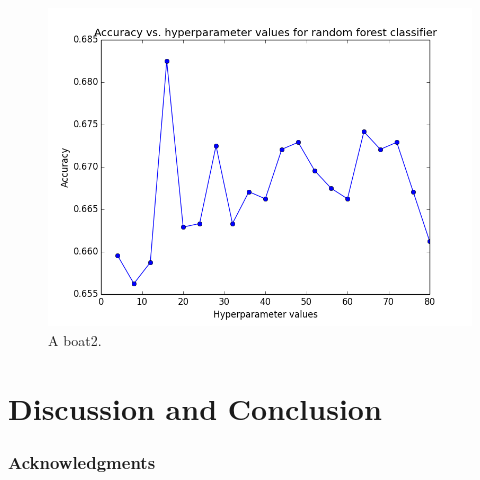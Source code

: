 \documentclass{article} %
\begin{document}
\begin{figure}
\centering
  \includegraphics[width=0.5\linewidth]{hyperparameter_fitting_random_forest.png}
  \caption{A boat2.}
  \label{fig:boat2}
\end{figure}


\section{Discussion and Conclusion}

\subsubsection*{Acknowledgments}




\end{document}
